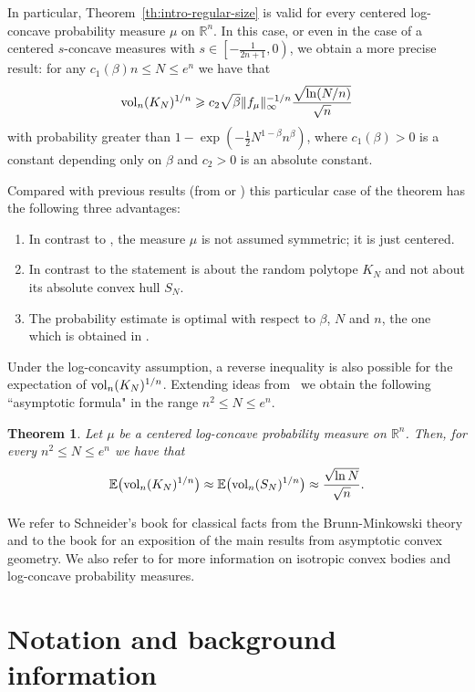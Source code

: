 \documentclass[11pt,leqno]{article}
\newtheorem{theorem}{Theorem}[section]
\theoremstyle{definition}
\theoremstyle{remark}
\numberwithin{equation}{section}
\newcommand{\vol}{{\rm vol}}
\newcommand{\ls}{\leqslant}
\newcommand{\gr}{\geqslant}
\newcommand{\1}{\textbf{1}}
\begin{document}
In particular, Theorem~\ref{th:intro-regular-size} is valid for every centered log-concave probability
measure $\mu$ on $\mathbb{R}^n$. In this case, or even in the case of a centered $s$-concave measures with $s \in \left[-\frac{1}{2n+1},0\right)$, we obtain a more precise result: for any $c_1(\beta)n \ls N \ls e^n$ we have that
$$\vol_n(K_N)^{1/n}\gr c_2 \sqrt{\beta} \|f_{\mu}\|_{\infty}^{-1/n}\frac{\sqrt{\ln(N/n)}}{\sqrt{n}}$$
with probability greater than $1-\exp(-\tfrac{1}{2}N^{1-\beta}n^{\beta})$, where $c_1(\beta)>0$ is a constant depending only on $\beta$ and $c_2>0$ is an absolute constant.

Compared with previous results (from \cite{DGT1} or \cite{GKKMR-2022})
this particular case of the theorem has the following three advantages:
\begin{enumerate}
\item[(i)] In contrast to \cite{GKKMR-2022}, the measure $\mu$ is not assumed
symmetric; it is just centered.
\item[(ii)] In contrast to \cite{DGT1} the statement is about the random polytope $K_N$ and not about its
absolute convex hull $S_N$.
\item[(iii)] The probability estimate is optimal with respect to $\beta$, $N$ and $n$, the one which is obtained
in \cite{GKKMR-2022}.
\end{enumerate}
Under the log-concavity assumption, a reverse inequality is also possible for the expectation
of $\vol_n(K_N)^{1/n}$. Extending ideas from~\cite{DGT1} we obtain the following ``asymptotic formula"
in the range $n^2\ls N\ls e^n$.

\begin{theorem}\label{th:log-concave-expectation}Let $\mu $ be a centered log-concave probability measure
on $\mathbb{R}^n$. Then, for every $n^2\ls N\ls e^n$ we have that
$$\mathbb{E}\big(\vol_n(K_N)^{1/n}\big)\approx \mathbb{E}\big(\vol_n(S_N)^{1/n}\big)
\approx \frac{\sqrt{\ln N}}{\sqrt{n}}.$$
\end{theorem}

We refer to Schneider's book \cite{Schneider-book} for classical facts from the Brunn-Minkowski theory and to the book
\cite{AGA-book} for an exposition of the main results from asymptotic convex geometry. We also refer
to \cite{BGVV-book} for more information on isotropic convex bodies and log-concave probability measures.

\section{Notation and background information}\label{section-2}
\end{document}
